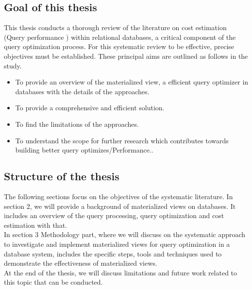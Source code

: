 \subsection{Goal of this thesis}
\normalsize
This thesis conducts a thorough review of the literature on cost estimation (Query performance ) within relational databases, a critical component of the query optimization process. For this systematic review to be effective, precise objectives must be established. These principal aims are outlined as follows in the study.\cite{CostEstimation}
\begin{itemize}
  \item To provide an overview of the materialized view, a efficient  query optimizer in databases with the details of the approaches.
  \item To provide a comprehensive and efficient solution.
  \item To find the limitations of the approaches.
  \item To understand the scope for further research which contributes towards building
better query optimizes/Performance..\cite{CostEstimation}
\end{itemize}
\subsection{Structure of the thesis }
The following sections  focus on the objectives of the systematic literature. In section 2, we will provide a background of materialized views on databases. It includes an overview of the query processing, query optimization and cost estimation with that.\\
In section 3 Methodology part, where we will discuss on the systematic approach to investigate and implement materialized views for query optimization in a database system, includes the specific steps, tools and techniques used to demonstrate the effectiveness of materialized views.\\
At the end of the thesis, we will discuss limitations and future work related to this topic that can be conducted.









